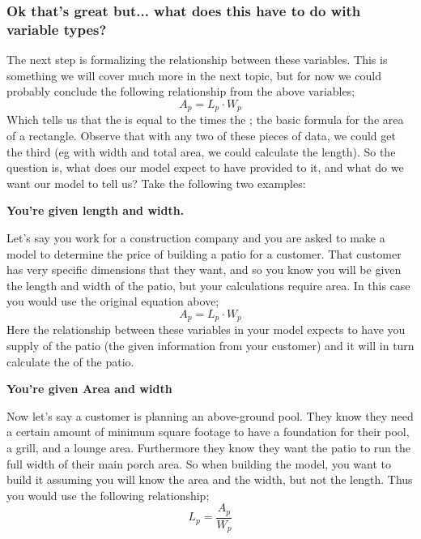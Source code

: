 \documentclass{ximeraXloud}
\begin{document}
\subsubsection*{Ok that's great but... what does this have to do with variable types?}
    \begin{exploration}
        The next step is formalizing the relationship between these variables. This is something we will cover much more in the next topic, but for now we could probably conclude the following relationship from the above variables;
        \[
            A_p = L_p \cdot W_p
        \]
        Which tells us that the  is equal to the  times the ; the basic formula for the area of a rectangle. Observe that with any two of these pieces of data, we could get the third (eg with width and total area, we could calculate the length). So the question is, what does our model expect to have provided to it, and what do we want our model to tell us? Take the following two examples:
    \end{exploration}
    
    \begin{example}
        {\large\bfseries You're given length and width.}%
    
        Let's say you work for a construction company and you are asked to make a model to determine the price of building a patio for a customer. That customer has very specific dimensions that they want, and so you know you will be given the length and width of the patio, but your calculations require area. In this case you would use the original equation above;
        \[
            A_p = L_p \cdot W_p
        \]
        Here the relationship between these variables in your model expects to have you supply  of the patio (the given information from your customer) and it will in turn calculate the  of the patio.
    \end{example}
    
    
    \begin{explanation}
        {\large\bfseries You're given Area and width}%
        
        Now let's say a customer is planning an above-ground pool. They know they need a certain amount of minimum square footage to have a foundation for their pool, a grill, and a lounge area. Furthermore they know they want the patio to run the full width of their main porch area. So when building the model, you want to build it assuming you will know the area and the width, but not the length. Thus you would use the following relationship;
        \[
            L_p = \frac{A_p}{W_p}
        \]
    \end{explanation}
    
\end{document}
